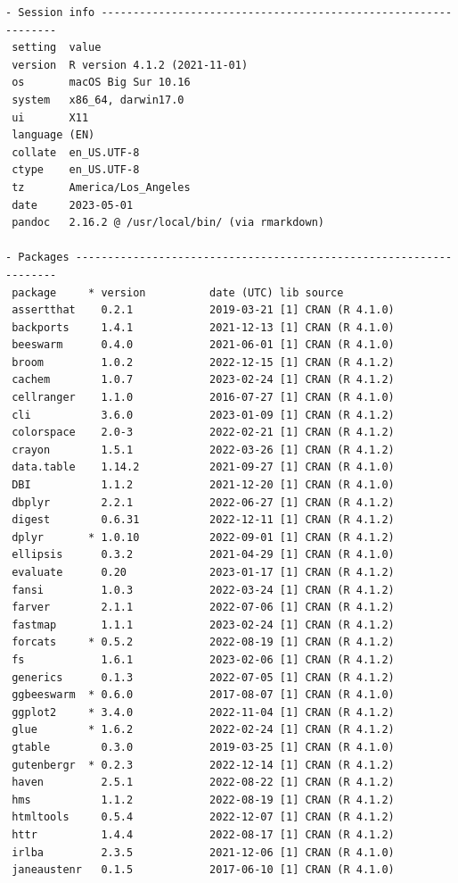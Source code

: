 \documentclass[
]{article}
\begin{document}
\begin{verbatim}
- Session info ---------------------------------------------------------------
 setting  value
 version  R version 4.1.2 (2021-11-01)
 os       macOS Big Sur 10.16
 system   x86_64, darwin17.0
 ui       X11
 language (EN)
 collate  en_US.UTF-8
 ctype    en_US.UTF-8
 tz       America/Los_Angeles
 date     2023-05-01
 pandoc   2.16.2 @ /usr/local/bin/ (via rmarkdown)

- Packages -------------------------------------------------------------------
 package     * version          date (UTC) lib source
 assertthat    0.2.1            2019-03-21 [1] CRAN (R 4.1.0)
 backports     1.4.1            2021-12-13 [1] CRAN (R 4.1.0)
 beeswarm      0.4.0            2021-06-01 [1] CRAN (R 4.1.0)
 broom         1.0.2            2022-12-15 [1] CRAN (R 4.1.2)
 cachem        1.0.7            2023-02-24 [1] CRAN (R 4.1.2)
 cellranger    1.1.0            2016-07-27 [1] CRAN (R 4.1.0)
 cli           3.6.0            2023-01-09 [1] CRAN (R 4.1.2)
 colorspace    2.0-3            2022-02-21 [1] CRAN (R 4.1.2)
 crayon        1.5.1            2022-03-26 [1] CRAN (R 4.1.2)
 data.table    1.14.2           2021-09-27 [1] CRAN (R 4.1.0)
 DBI           1.1.2            2021-12-20 [1] CRAN (R 4.1.0)
 dbplyr        2.2.1            2022-06-27 [1] CRAN (R 4.1.2)
 digest        0.6.31           2022-12-11 [1] CRAN (R 4.1.2)
 dplyr       * 1.0.10           2022-09-01 [1] CRAN (R 4.1.2)
 ellipsis      0.3.2            2021-04-29 [1] CRAN (R 4.1.0)
 evaluate      0.20             2023-01-17 [1] CRAN (R 4.1.2)
 fansi         1.0.3            2022-03-24 [1] CRAN (R 4.1.2)
 farver        2.1.1            2022-07-06 [1] CRAN (R 4.1.2)
 fastmap       1.1.1            2023-02-24 [1] CRAN (R 4.1.2)
 forcats     * 0.5.2            2022-08-19 [1] CRAN (R 4.1.2)
 fs            1.6.1            2023-02-06 [1] CRAN (R 4.1.2)
 generics      0.1.3            2022-07-05 [1] CRAN (R 4.1.2)
 ggbeeswarm  * 0.6.0            2017-08-07 [1] CRAN (R 4.1.0)
 ggplot2     * 3.4.0            2022-11-04 [1] CRAN (R 4.1.2)
 glue        * 1.6.2            2022-02-24 [1] CRAN (R 4.1.2)
 gtable        0.3.0            2019-03-25 [1] CRAN (R 4.1.0)
 gutenbergr  * 0.2.3            2022-12-14 [1] CRAN (R 4.1.2)
 haven         2.5.1            2022-08-22 [1] CRAN (R 4.1.2)
 hms           1.1.2            2022-08-19 [1] CRAN (R 4.1.2)
 htmltools     0.5.4            2022-12-07 [1] CRAN (R 4.1.2)
 httr          1.4.4            2022-08-17 [1] CRAN (R 4.1.2)
 irlba         2.3.5            2021-12-06 [1] CRAN (R 4.1.0)
 janeaustenr   0.1.5            2017-06-10 [1] CRAN (R 4.1.0)

\end{verbatim}
\end{document}
